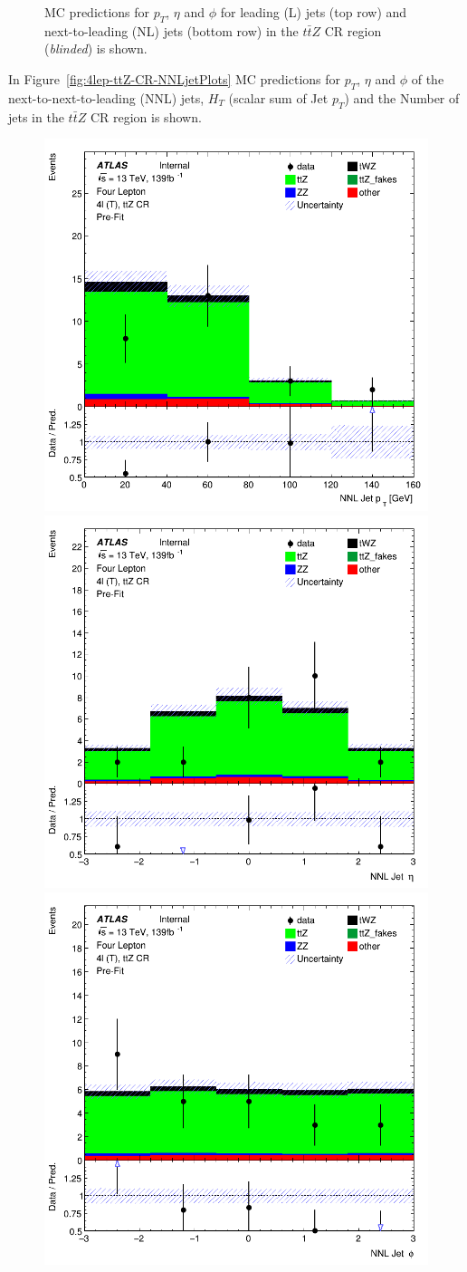 \begin{figure}[htbp]
\begin{tabular}{ccc}
  \end{tabular}
    \caption{MC predictions for $p_{T}$, $\eta$ and $\phi$ for leading (L) jets (top row) and next-to-leading (NL) jets (bottom row) in the $t\bar{t}Z$ CR region (\textit{blinded}) is shown.}
    \label{fig:4lep-ttZ-CR-LandNjetPlots} 
\end{figure}

In Figure~\ref{fig:4lep-ttZ-CR-NNLjetPlots} MC predictions for $p_{T}$, $\eta$ and $\phi$ of the next-to-next-to-leading (NNL) jets, $H_{T}$ (scalar sum of Jet $p_{T}$) and the Number of jets in the $t\bar{t}Z$ CR region is shown.


\begin{figure}[htbp]
 \centering


    \includegraphics[width=.3\textwidth]{figures/PreFitPlots/lep4_ttZ_4T_NNLJet_pt.png} \quad
    \includegraphics[width=.3\textwidth]{figures/PreFitPlots/lep4_ttZ_4T_NNLJet_eta.png} \quad
    \includegraphics[width=.3\textwidth]{figures/PreFitPlots/lep4_ttZ_4T_NNLJet_phi.png}

    \medskip


\end{figure}
